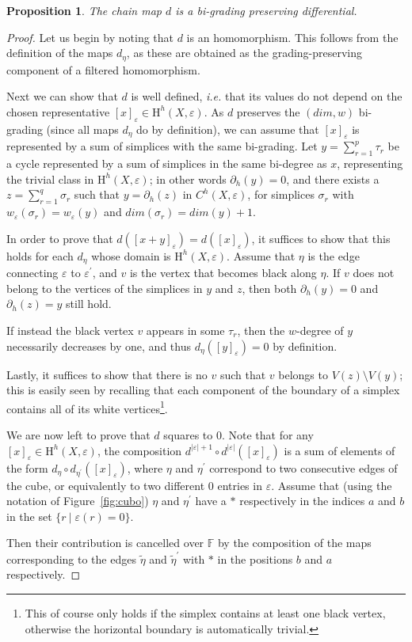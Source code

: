 \documentclass[11pt, a4paper, reqno, twoside, makeidx]{amsart}
\theoremstyle{remark}
\theoremstyle{plain}
\newtheorem{prop}[thm]{Proposition}
\theoremstyle{definition}
\newcommand{\F}{\mathbb{F}}
\newcommand{\HH}{\mathrm{H}}
\begin{document}
\begin{prop}\label{prop:dsquare}
The chain map $d$ is a bi-grading preserving differential.
\end{prop}
\begin{proof}
Let us begin by noting that $d$ is an homomorphism. This follows from the definition of the maps $d_\eta$, as these are obtained as the grading-preserving component of a filtered homomorphism.

Next we can show that $d$ is well defined, \emph{i.e.} that its values do not depend on the chosen representative $[x]_\varepsilon \in \HH^h(X, \varepsilon)$. As $d$ preserves the $(dim, w)$ bi-grading (since all maps $d_\eta$ do by definition), we can assume that $[x]_\varepsilon$ is represented by a sum of simplices with the same bi-grading. Let $y = \sum_{r=1}^p \tau_r$ be a cycle represented by a sum of simplices in the same bi-degree as $x$, representing the trivial class in $\HH^h(X, \varepsilon)$; in other words $\partial_h(y) = 0$, and there exists a $z = \sum_{r = 1}^q \sigma_r$ such that $y = \partial_h \left(z\right)$ in $C^h(X, \varepsilon)$, for simplices $\sigma_r$ with $w_\varepsilon(\sigma_r) = w_\varepsilon (y)$ and $dim(\sigma_r) = dim(y)+1$. 

In order to prove that $d([x + y]_\varepsilon) = d([x]_\varepsilon)$, it suffices to show that this holds for each $d_{\eta}$ whose domain is $\HH^h(X, \varepsilon)$. Assume that $\eta$ is the edge connecting $\varepsilon$ to $\varepsilon^\prime$, and $v$ is the vertex that becomes black along $\eta$. 
If $v$ does not belong to the vertices of the simplices in $y$ and $z$, then both $\partial_h(y) = 0$ and $\partial_h(z) = y$ still hold. 

If instead the black vertex $v$ appears in some $\tau_r$, then the $w$-degree of $y$ necessarily decreases by one, and thus $d_\eta ([y]_\varepsilon) = 0$ by definition. 

Lastly, it suffices to show that there is no $v$ such that $v$ belongs to $V(z)\setminus V(y)$; this is easily seen by recalling that each component of the boundary of a simplex contains all of its white vertices\footnote{This of course only holds if the simplex contains at least one black vertex, otherwise the horizontal boundary is automatically trivial.}.

We are now left to prove that $d$ squares to $0$. Note that for any $[x]_\varepsilon  \in \HH^h(X, \varepsilon)$, the composition  $d^{|\varepsilon|+1} \circ d^{|\varepsilon|} ([x]_\varepsilon)$ is a sum of elements of the form $d_{\eta} \circ d_{\eta^\prime}([x]_\varepsilon)$, where $\eta$ and $\eta^\prime$ correspond to two consecutive edges of the cube, or equivalently to two different $0$ entries in $\varepsilon$. Assume that (using the notation of Figure~\ref{fig:cubo}) $\eta$ and $\eta^\prime$ have a $*$ respectively in the indices $a$ and $b$ in the set $\{r \:|\;\varepsilon(r) = 0\}$. 

Then their contribution is cancelled over $\F$ by the composition of the maps corresponding to the edges $\widetilde{\eta}$ and $\widetilde{\eta}^\prime$ with $*$ in the positions $b$ and $a$ respectively.


\end{proof}
\end{document}
